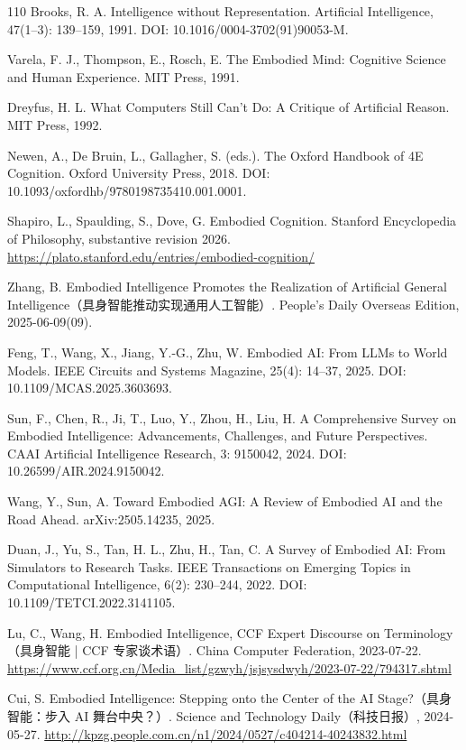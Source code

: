 \documentclass[10pt]{article}
\begin{document}
\begin{thebibliography}{110}
Brooks, R. A. Intelligence without Representation. Artificial Intelligence, 47(1–3): 139–159, 1991. DOI: 10.1016/0004-3702(91)90053-M.

Varela, F. J., Thompson, E., Rosch, E. The Embodied Mind: Cognitive Science and Human Experience. MIT Press, 1991.

Dreyfus, H. L. What Computers Still Can't Do: A Critique of Artificial Reason. MIT Press, 1992.

Newen, A., De Bruin, L., Gallagher, S. (eds.). The Oxford Handbook of 4E Cognition. Oxford University Press, 2018. DOI: 10.1093/oxfordhb/9780198735410.001.0001.

Shapiro, L., Spaulding, S., Dove, G. Embodied Cognition. Stanford Encyclopedia of Philosophy, substantive revision 2026. \url{https://plato.stanford.edu/entries/embodied-cognition/}

Zhang, B. Embodied Intelligence Promotes the Realization of Artificial General Intelligence（具身智能推动实现通用人工智能）. People's Daily Overseas Edition, 2025-06-09(09).

Feng, T., Wang, X., Jiang, Y.-G., Zhu, W. Embodied AI: From LLMs to World Models. IEEE Circuits and Systems Magazine, 25(4): 14–37, 2025. DOI: 10.1109/MCAS.2025.3603693.

Sun, F., Chen, R., Ji, T., Luo, Y., Zhou, H., Liu, H. A Comprehensive Survey on Embodied Intelligence: Advancements, Challenges, and Future Perspectives. CAAI Artificial Intelligence Research, 3: 9150042, 2024. DOI: 10.26599/AIR.2024.9150042.

Wang, Y., Sun, A. Toward Embodied AGI: A Review of Embodied AI and the Road Ahead. arXiv:2505.14235, 2025.

Duan, J., Yu, S., Tan, H. L., Zhu, H., Tan, C. A Survey of Embodied AI: From Simulators to Research Tasks. IEEE Transactions on Emerging Topics in Computational Intelligence, 6(2): 230–244, 2022. DOI: 10.1109/TETCI.2022.3141105.

Lu, C., Wang, H. Embodied Intelligence, CCF Expert Discourse on Terminology（具身智能 | CCF 专家谈术语）. China Computer Federation, 2023-07-22. \url{https://www.ccf.org.cn/Media_list/gzwyh/jsjsysdwyh/2023-07-22/794317.shtml}

Cui, S. Embodied Intelligence: Stepping onto the Center of the AI Stage?（具身智能：步入 AI 舞台中央？）. Science and Technology Daily（科技日报）, 2024-05-27. \url{http://kpzg.people.com.cn/n1/2024/0527/c404214-40243832.html}


\end{thebibliography}
\end{document}
